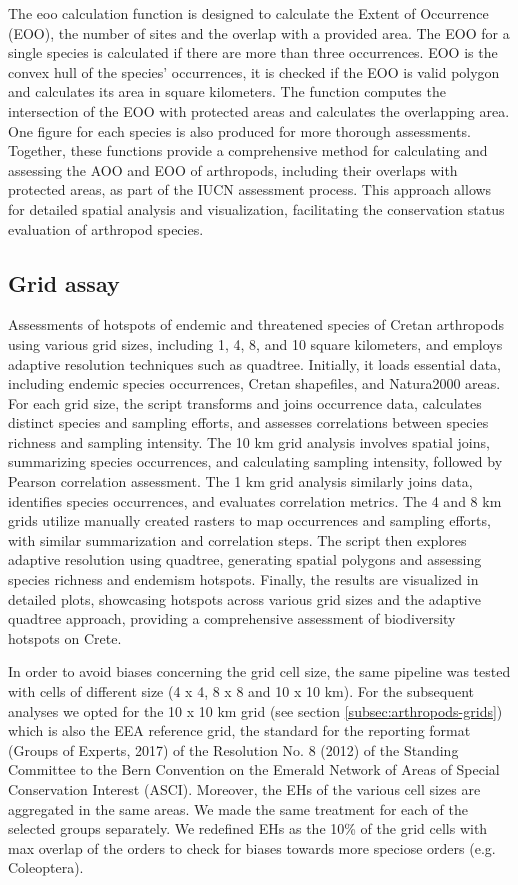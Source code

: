 The eoo calculation function is designed to calculate the Extent of Occurrence (EOO),
the number of sites and the overlap with a provided area.
The EOO for a single species is calculated if there are more than three occurrences.
EOO is the convex hull of the species' occurrences, it is checked if the EOO is valid
polygon and calculates its area in square kilometers. The function computes the intersection of the EOO with protected areas and calculates the overlapping area.
One figure for each species is also produced for more thorough assessments.
Together, these functions provide a comprehensive method for calculating and
assessing the AOO and EOO of arthropods, including their overlaps with protected
areas, as part of the IUCN assessment process. This approach allows for detailed
spatial analysis and visualization, facilitating the conservation status evaluation of arthropod species.


    \subsection{Grid assay}
    \label{subsec:arthropods-ehs-kbas}
Assessments of hotspots of endemic and threatened species of Cretan arthropods using various grid sizes, including 1, 4, 8, and 10 square kilometers, and employs adaptive resolution techniques such as quadtree. Initially, it loads essential data, including endemic species occurrences, Cretan shapefiles, and Natura2000 areas. For each grid size, the script transforms and joins occurrence data, calculates distinct species and sampling efforts, and assesses correlations between species richness and sampling intensity. The 10 km grid analysis involves spatial joins, summarizing species occurrences, and calculating sampling intensity, followed by Pearson correlation assessment. The 1 km grid analysis similarly joins data, identifies species occurrences, and evaluates correlation metrics. The 4 and 8 km grids utilize manually created rasters to map occurrences and sampling efforts, with similar summarization and correlation steps. The script then explores adaptive resolution using quadtree, generating spatial polygons and assessing species richness and endemism hotspots. Finally, the results are visualized in detailed plots, showcasing hotspots across various grid sizes and the adaptive quadtree approach, providing a comprehensive assessment of biodiversity hotspots on Crete.


In order to avoid biases concerning the grid cell size, the same
pipeline was tested with cells of different size (4 x 4, 8 x 8 and 10 x 10 km).
For the subsequent analyses we opted for the 10 x 10 km grid (see section \ref{subsec:arthropods-grids})
which is also the EEA reference grid, the standard for the reporting format
(Groups of Experts, 2017) of the Resolution No. 8 (2012) of the Standing Committee
to the Bern Convention on the Emerald Network of Areas of Special Conservation Interest (ASCI).
Moreover, the EHs of the various cell sizes are aggregated in the same areas.
We made the same treatment for each of the selected groups separately.
We redefined EHs as the 10\% of the grid cells with max overlap of the orders
to check for biases towards more speciose orders (e.g. Coleoptera).

